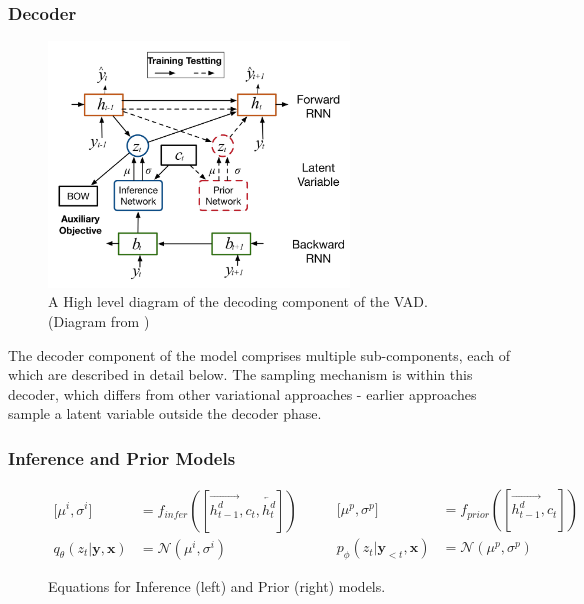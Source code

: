 \documentclass[12pt,twoside]{report}
\begin{document}
\subsubsection{Decoder}
\begin{figure}[!ht]
	\centering
	\includegraphics[width=80mm]{diagrams/vad_decoder.png}
	\caption{A High level diagram of the decoding component of the VAD. (Diagram from \cite{du_variational_2018})\label{r:vad_decoder}}
	\end{figure}
	
The decoder component of the model comprises multiple sub-components, each of which are described in detail below. The sampling mechanism is within this decoder, which differs from other variational approaches - earlier approaches sample a latent variable outside the decoder phase.

\subsubsection{Inference and Prior Models}

\begin{figure}[!ht]
	\label{eqn:inf_prior}
	\begin{equation}
		\begin{split}
			\lbrack \mu^i, \sigma^i \rbrack &=
			f_{infer}([\overrightarrow{h^d_{t-1}}, c_t, \overleftarrow{h^d_t}])
			\\
			q_{\theta}(z_t|\boldsymbol{y}, \boldsymbol{x}) &= \mathcal{N}(\mu^i, \sigma^i)
		\end{split}
		\quad\quad
		\begin{split}
			\lbrack \mu^p, \sigma^p \rbrack &=
			f_{prior}([\overrightarrow{h^d_{t-1}}, c_t])
			\\
			p_{\phi}(z_t|\boldsymbol{y}_{<t}, \boldsymbol{x}) &= \mathcal{N}(\mu^p, \sigma^p)
		\end{split}
	\end{equation}
	\caption{Equations for Inference (left) and Prior (right) models.}
	\label{inf_prior}
	\end{figure}
\end{document}
